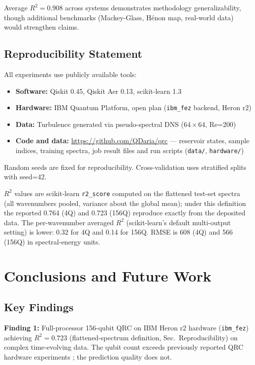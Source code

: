 \documentclass[conference]{IEEEtran}
\begin{document}
\noindent Average $R^2=0.908$ across systems demonstrates methodology generalizability, though additional benchmarks (Mackey-Glass, Hénon map, real-world data) would strengthen claims.

\subsection{Reproducibility Statement}

All experiments use publicly available tools:
\begin{itemize}
    \item \textbf{Software:} Qiskit 0.45, Qiskit Aer 0.13, scikit-learn 1.3
    \item \textbf{Hardware:} IBM Quantum Platform, open plan (\texttt{ibm\_fez} backend, Heron r2)
    \item \textbf{Data:} Turbulence generated via pseudo-spectral DNS ($64 \times 64$, Re=200)
    \item \textbf{Code and data:} \url{https://github.com/QDaria/qrc} --- reservoir states, sample indices, training spectra, job result files and run scripts (\texttt{data/}, \texttt{hardware/})
\end{itemize}

\noindent Random seeds are fixed for reproducibility. Cross-validation uses stratified splits with seed=42.

\noindent $R^2$ values are scikit-learn \texttt{r2\_score} computed on the flattened test-set spectra (all wavenumbers pooled, variance about the global mean); under this definition the reported 0.764 (4Q) and 0.723 (156Q) reproduce exactly from the deposited data. The per-wavenumber averaged $R^2$ (scikit-learn's default multi-output setting) is lower: 0.32 for 4Q and 0.14 for 156Q. RMSE is 608 (4Q) and 566 (156Q) in spectral-energy units.

\section{Conclusions and Future Work}
\label{sec:conclusions}

\subsection{Key Findings}

\textbf{Finding 1:} Full-processor 156-qubit QRC on IBM Heron r2 hardware (\texttt{ibm\_fez}) achieving $R^2=0.723$ (flattened-spectrum definition, Sec.~Reproducibility) on complex time-evolving data. The qubit count exceeds previously reported QRC hardware experiments \cite{yasuda2023quantum, kornjaca2024largescale}; the prediction quality does not.
\end{document}
